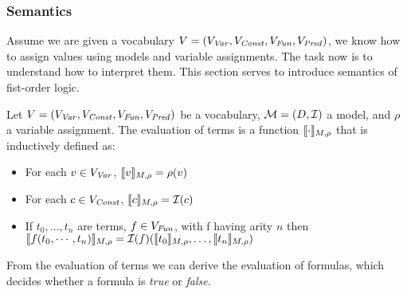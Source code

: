\subsubsection{Semantics}
Assume we are given a vocabulary $V = (V_{\mathit{Var}}, V_{\mathit{Const}}, V_{\mathit{Fun}}, V_{\mathit{Pred}})$, we know how to assign values using models and variable assignments. The task now is to understand how to interpret them. This section serves to introduce semantics of fist-order logic.
\begin{mydef}
	Let $V = (V_{\mathit{Var}}, V_{\mathit{Const}}, V_{\mathit{Fun}}, V_{\mathit{Pred}})$ be a vocabulary, $\mathcal{M} = (D, \mathcal{I})$ a model, and $\rho$ a variable assignment. The evaluation of terms is a function $\llbracket \cdot \rrbracket_{M, \rho}$ that is inductively defined as:
	\begin{itemize}
		\item For each $v \in V_{\mathit{Var}}$, $\llbracket v \rrbracket_{M, \rho} = \rho(v)$
		\item For each $c \in V_{\mathit{Const}}$, $\llbracket c \rrbracket_{M, \rho} = \mathcal{I}(c)$
		\item If $t_0, \ldots, t_n$ are terms, $f \in V_{\mathit{Fun}}$, with f having arity $n$ then \\ $\llbracket f(t_0, \cdots, t_n) \rrbracket_{M, \rho} = \mathcal{I}(f)(\llbracket t_0 \rrbracket_{M, \rho}, \ldots, \llbracket t_n \rrbracket_{M, \rho})$
	\end{itemize}
\end{mydef}
From the evaluation of terms we can derive the evaluation of formulas, which decides whether a formula is \textsl{true} or \textsl{false}.

